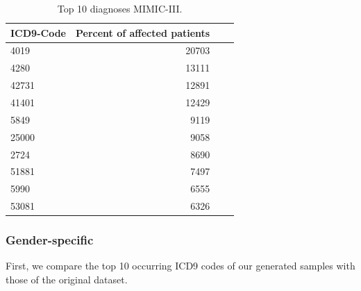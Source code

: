 \documentclass[11pt, a4paper]{book}
\begin{document}
\begin{table}
\begin{tabularx}{\textwidth}{p{}|r|X|r}
\textbf{ICD9-Code} & \textbf{Percent of affected patients}\\
\hline
4019 & 20703\\
4280   & 13111\\
42731    & 12891\\
41401    & 12429\\
5849      & 9119\\
25000     & 9058\\
2724     & 8690\\
51881    & 7497\\
5990     & 6555\\
53081    & 6326\\
\end{tabularx}
\caption{\label{tab:top10-icd-mimic}Top 10 diagnoses MIMIC-III.}
\end{table}

\subsubsection{Gender-specific}
First, we compare the top 10 occurring ICD9 codes of our generated samples with those of the original dataset.
\end{document}
